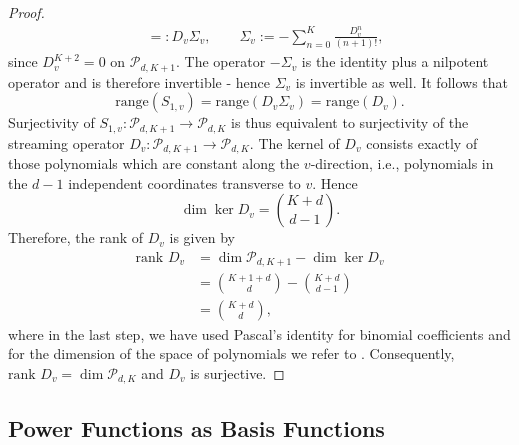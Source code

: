 \documentclass{amsart}
\theoremstyle{plain}
\theoremstyle{definition}
\begin{document}
\begin{proof}
\begin{equation}
\begin{split}
      & =: D_v \Sigma_v,\qquad \Sigma_v:=-\sum_{n=0}^{K}\frac{D_v^n}{(n+1)!},
       \end{split}
\end{equation} 
since $D_v^{K+2}=0$ on $\mathcal{P}_{d,K+1}$. The operator $-\Sigma_v$ is the identity plus a nilpotent operator and is therefore invertible - hence $\Sigma_v$ is invertible as well. It follows that
\begin{equation}
    \text{range}(S_{1,v}) = \text{range}(D_v\Sigma_v) = \text{range}(D_v). 
\end{equation}
Surjectivity of $S_{1,v}:\mathcal{P}_{d,K+1}\to\mathcal{P}_{d,K}$ is thus equivalent to surjectivity of the streaming operator $D_v:\mathcal{P}_{d,K+1}\to\mathcal{P}_{d,K}$. The kernel of $D_v$ consists exactly of those polynomials which are constant along the $v$-direction, i.e., polynomials in the $d-1$ independent coordinates transverse to $v$. Hence
\begin{equation}
    \dim \ker D_v = \binom{K+d}{d-1}. 
\end{equation}
Therefore, the rank of $D_v$ is given by
\begin{equation}
\begin{split}
    \text{rank } D_v & = \dim \mathcal{P}_{d,K+1} - \dim \ker D_v\\
     & = \binom{K+1+d}{d} - \binom{ K+d}{ d-1}\\
     & = \binom{K+d}{d},
    \end{split}
\end{equation}
where in the last step, we have used Pascal's identity for binomial coefficients and for the dimension of the space of polynomials we refer to \cite{cox2015ideals}. Consequently,  $\text{rank } D_v = \dim \mathcal{P}_{d,K} $ and $D_v$ is surjective. 
\end{proof}


\subsection{Power Functions as Basis Functions}

\end{document}
